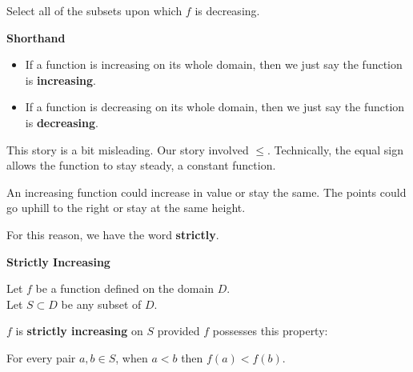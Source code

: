 \documentclass{ximera}
\begin{document}
\begin{example}
\begin{question} 


Select all of the subsets upon which $f$ is decreasing.


\begin{selectAll}
\choice [correct]{$[-2,6)$}
\choice [correct]{$[6,8]$}
\end{selectAll}
\end{question}





\end{example}




\begin{remark} \textbf{\textcolor{yellow!35!black}{Shorthand}}


  \begin{itemize}
    \item If a function is increasing on its whole domain, then we just say the function is \textbf{increasing}.
    \item If a function is decreasing on its whole domain, then we just say the function is \textbf{decreasing}.
  \end{itemize}
\end{remark}




This story is a bit misleading.  Our story involved $\leq$.  Technically, the equal sign allows the function to stay steady, a constant function. 

An increasing function could increase in value or stay the same.  The points could go uphill to the right or stay at the same height. 

For this reason, we have the word \textbf{strictly}.








\begin{definition} \textbf{\textcolor{green!50!black}{Strictly Increasing}} 


Let $f$ be a function defined on the domain $D$. \\
Let $S \subset D$ be any subset of $D$.

$f$ is \textbf{strictly increasing} on $S$ provided $f$ possesses this property:  


\begin{center}
For every pair $a, b \in S$, when $a < b$ then $f(a) < f(b)$.
\end{center}

\end{definition}
\end{document}

